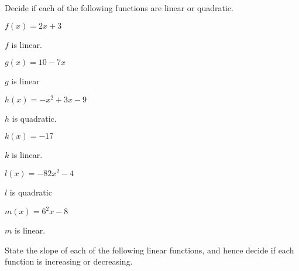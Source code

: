  	\begin{exercises}
 	\begin{problem}
 	Decide if each of the following functions are linear or quadratic.
 	\begin{multicols}{3}
 		\begin{subproblem}
 			$f(x)=2x+3$
 			\begin{shortsolution}
 				$f$ is linear.
 			\end{shortsolution}
 		\end{subproblem}
 		\begin{subproblem}
 			$g(x)=10-7x$
 			\begin{shortsolution}
 				$g$ is linear
 			\end{shortsolution}
 		\end{subproblem}
 		\begin{subproblem}
 			$h(x)=-x^2+3x-9$
 			\begin{shortsolution}
 				$h$ is quadratic.
 			\end{shortsolution}
 		\end{subproblem}
 		\begin{subproblem}
 			$k(x)=-17$
 			\begin{shortsolution}
 				$k$ is linear.
 			\end{shortsolution}
 		\end{subproblem}
 		\begin{subproblem}
 			$l(x)=-82x^2-4$
 			\begin{shortsolution}
 				$l$ is quadratic
 			\end{shortsolution}
 		\end{subproblem}
 		\begin{subproblem}
 			$m(x)=6^2x-8$
 			\begin{shortsolution}
 				$m$ is linear.
 			\end{shortsolution}
 		\end{subproblem}
 	\end{multicols}
 	\end{problem}
 	\begin{problem}
 	State the slope of each of the following linear functions, and
 	hence decide if each function is increasing or decreasing.

\end{problem}
\end{exercises}
